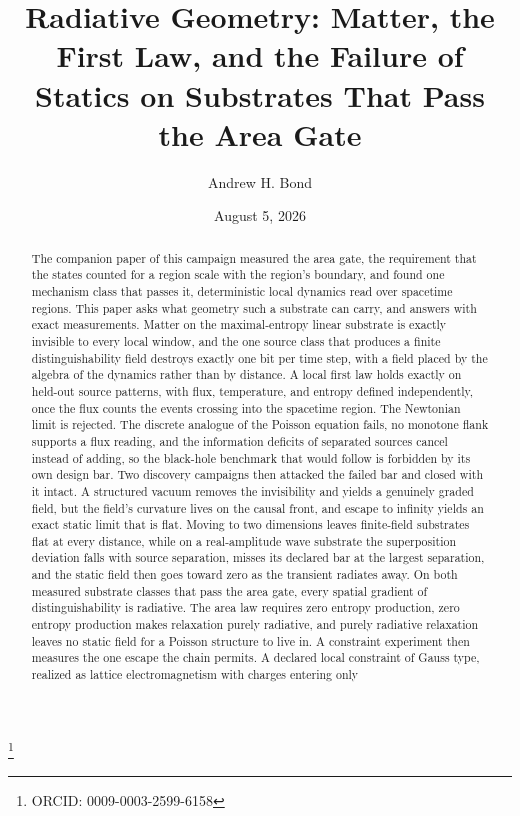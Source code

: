 \documentclass[aps,pre,reprint,nofootinbib]{revtex4-2}
\begin{document}
\title{Radiative Geometry: Matter, the First Law, and the Failure of
Statics on Substrates That Pass the Area Gate}

\author{Andrew H. Bond}
\thanks{ORCID: 0009-0003-2599-6158}
\date{August 5, 2026}

\begin{abstract}
The companion paper of this campaign measured the area gate, the
requirement that the states counted for a region scale with the
region's boundary, and found one mechanism class that passes it,
deterministic local dynamics read over spacetime regions.  This paper
asks what geometry such a substrate can carry, and answers with exact
measurements.  Matter on the maximal-entropy linear substrate is
exactly invisible to every local window, and the one source class
that produces a finite distinguishability field destroys exactly one
bit per time step, with a field placed by the algebra of the dynamics
rather than by distance.  A local first law holds exactly on held-out
source patterns, with flux, temperature, and entropy defined
independently, once the flux counts the events crossing into the
spacetime region.  The Newtonian limit is rejected.  The discrete
analogue of the Poisson equation fails, no monotone flank supports a
flux reading, and the information deficits of separated sources
cancel instead of adding, so the black-hole benchmark that would
follow is forbidden by its own design bar.  Two discovery campaigns
then attacked the failed bar and closed with it intact.  A structured
vacuum removes the invisibility and yields a genuinely graded field,
but the field's curvature lives on the causal front, and escape to
infinity yields an exact static limit that is flat.  Moving to two
dimensions leaves finite-field substrates flat at every distance,
while on a real-amplitude wave substrate the superposition deviation
falls with source separation, misses its declared bar at the largest
separation, and the static field then goes toward zero as the
transient radiates away.  On both measured substrate classes that
pass the area gate, every spatial gradient of distinguishability is
radiative.  The area law requires zero entropy
production, zero entropy production makes relaxation purely
radiative, and purely radiative relaxation leaves no static field for
a Poisson structure to live in.  A constraint experiment then
measures the one escape the chain permits.  A declared local constraint of Gauss
type, realized as lattice electromagnetism with charges entering only

\end{abstract}
\end{document}
